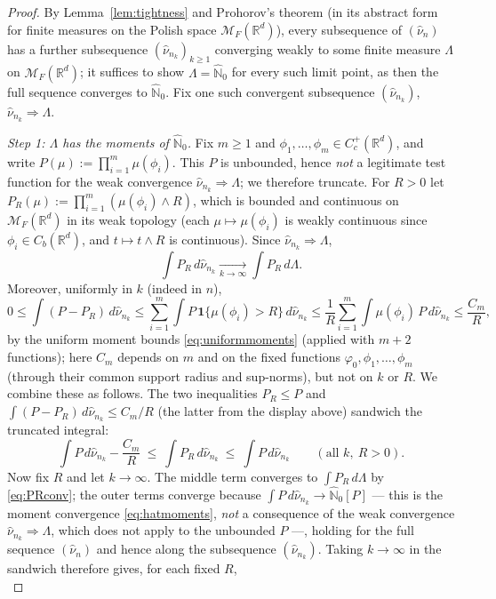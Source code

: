 \documentclass[11pt]{article}
\theoremstyle{definition}
\theoremstyle{remark}
\newcommand{\R}{\mathbb{R}}
\newcommand{\cM}{{\mathcal{M}_F(\R^d)}}          %
\newcommand{\Cc}{C_c^+(\R^d)}
\newcommand{\nuh}{\hat{\nu}}
\newcommand{\Nh}{\hat{\mathbb{N}}_0}
\numberwithin{equation}{section}
\theoremstyle{plain}
\theoremstyle{definition}
\theoremstyle{remark}
\theoremstyle{plain}
\begin{document}
\begin{proof}
By Lemma~\ref{lem:tightness} and Prohorov's theorem (in its abstract form
for finite measures on the Polish space $\cM$), every subsequence of
$(\nuh_n)$ has a further subsequence $(\nuh_{n_k})_{k\ge1}$ converging weakly
to some finite measure $\Lambda$ on $\cM$; it suffices to show $\Lambda=\Nh$
for every such limit point, as then the full sequence converges to $\Nh$.
Fix one such convergent subsequence $(\nuh_{n_k})$, $\nuh_{n_k}
\Rightarrow\Lambda$.

\emph{Step 1: $\Lambda$ has the moments of $\Nh$.}
Fix $m\ge1$ and $\phi_1,\dots,\phi_m\in\Cc$, and write
$P(\mu):=\prod_{i=1}^m\mu(\phi_i)$. This $P$ is unbounded, hence \emph{not}
a legitimate test function for the weak convergence
$\nuh_{n_k}\Rightarrow\Lambda$; we therefore truncate. For $R>0$ let
$P_R(\mu):=\prod_{i=1}^m(\mu(\phi_i)\wedge R)$, which is bounded and
continuous on $\cM$ in its weak topology (each $\mu\mapsto\mu(\phi_i)$ is weakly
continuous since $\phi_i\in C_b(\R^d)$, and $t\mapsto t\wedge R$ is continuous).
Since $\nuh_{n_k}\Rightarrow\Lambda$,
\begin{equation}\label{eq:PRconv}
\int P_R\,d\nuh_{n_k}\xrightarrow[k\to\infty]{}\int P_R\,d\Lambda .
\end{equation}
Moreover, uniformly in $k$ (indeed in $n$),
\[
0\le\int(P-P_R)\,d\nuh_{n_k}
\le\sum_{i=1}^m\int P\,\mathbf 1\{\mu(\phi_i)>R\}\,d\nuh_{n_k}
\le\frac1R\sum_{i=1}^m\int \mu(\phi_i)\,P\,d\nuh_{n_k}
\le\frac{C_m}{R},
\]
by the uniform moment bounds \eqref{eq:uniformmoments} (applied with $m+2$
functions); here $C_m$ depends on $m$ and on the fixed functions
$\varphi_0,\phi_1,\dots,\phi_m$ (through their common support radius and
sup-norms), but not on $k$ or $R$. We combine these as follows. The two inequalities
$P_R\le P$ and $\int(P-P_R)\,d\nuh_{n_k}\le C_m/R$ (the latter from the display
above) sandwich the truncated integral:
\[
\int P\,d\nuh_{n_k}-\frac{C_m}{R}\ \le\ \int P_R\,d\nuh_{n_k}\ \le\ \int
P\,d\nuh_{n_k}\qquad(\text{all }k,\ R>0).
\]
Now fix $R$ and let $k\to\infty$. The middle term converges to $\int
P_R\,d\Lambda$ by \eqref{eq:PRconv}; the outer terms converge because
$\int P\,d\nuh_{n_k}\to\Nh[P]$ --- this is the moment convergence
\eqref{eq:hatmoments}, \emph{not} a consequence of the weak convergence
$\nuh_{n_k}\Rightarrow\Lambda$, which does not apply to the unbounded $P$ ---,
holding for the full sequence $(\nuh_n)$ and hence along the subsequence
$(\nuh_{n_k})$.
Taking $k\to\infty$ in the sandwich therefore gives, for each fixed $R$,
\begin{equation}\label{eq:PRsandwich}

\end{equation}
\end{proof}
\end{document}
